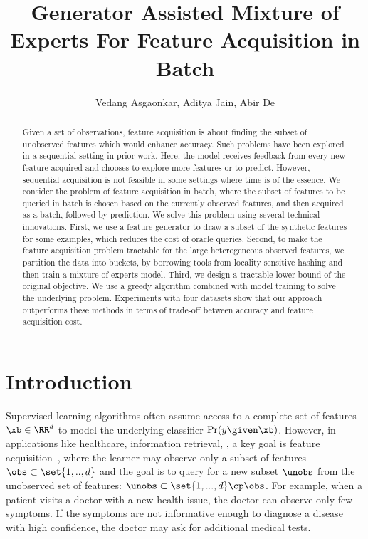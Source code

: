 \documentclass[letterpaper]{article}
\title{Generator Assisted  Mixture of Experts  For Feature Acquisition in Batch}
\author{
    Vedang Asgaonkar, Aditya Jain, Abir De
}
\renewcommand{\cite}{\citep}
\begin{document}


\maketitle


\begin{abstract}
Given a set of observations, feature acquisition is about finding the subset of unobserved features which would enhance accuracy. Such problems have been explored in a sequential setting in prior work. Here, the model receives feedback from every new feature acquired and chooses to explore more features or to predict. However, sequential acquisition is not feasible in some settings where time is of the essence. We consider the problem of feature acquisition in batch, where the subset of features to be queried in batch is chosen based on the currently observed features, and then acquired as a batch, followed by prediction. We solve this problem using several technical innovations. First, we use a feature generator to draw a subset of the synthetic features for some examples, which reduces the cost of oracle queries. Second, to make the feature acquisition problem tractable for the large heterogeneous observed features, we partition the data into buckets, by borrowing tools from locality sensitive hashing and then train a mixture of experts model. Third, we design a tractable lower bound of the original objective.
We use a greedy algorithm combined with model training to solve the underlying problem.
Experiments with four datasets show that our approach outperforms these methods in terms of trade-off between accuracy and feature acquisition cost. 
\end{abstract}


 
\vspace{-3mm}
 \section{Introduction}


Supervised learning algorithms often assume access to a complete set of features $\xb \in \RR^d$
to model the underlying classifier $\Pr(y\given \xb)$.
However, in applications like healthcare, information retrieval, \etc, a key goal is feature acquisition~\cite{babu2016wrapper, geng2007feature}, where the learner may observe only a subset of features $\obs \subset \set{1,..,d}$ and the goal is to query for a new subset $\unobs$ from the unobserved set of features: $\unobs \subset \set{1,...,d} \cp \obs$. For example, when a patient visits a doctor with a new health issue, the doctor can observe only few symptoms. If the symptoms are not informative enough to diagnose a disease with high confidence, the doctor may ask for additional medical tests.
 
\end{document}
